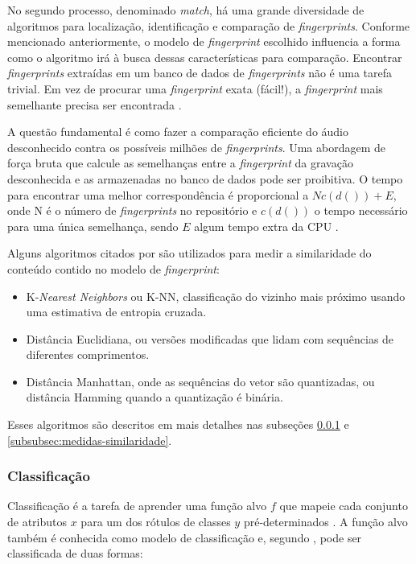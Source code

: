 No segundo processo, denominado \textit{match}, há uma grande diversidade de algoritmos para localização, identificação e comparação de \textit{fingerprints}. Conforme mencionado anteriormente, o modelo de \textit{fingerprint} escolhido influencia a forma como o algoritmo irá à busca dessas características para comparação. Encontrar \textit{fingerprints} extraídas em um banco de dados de \textit{fingerprints} não é uma tarefa trivial. Em vez de procurar uma \textit{fingerprint} exata (fácil!), a \textit{fingerprint} mais semelhante precisa ser encontrada \cite{haitsma2002}.

A questão fundamental é como fazer a comparação eficiente do áudio desconhecido contra os possíveis milhões de \textit{fingerprints}. Uma abordagem de força bruta que calcule as semelhanças entre a \textit{fingerprint} da gravação desconhecida e as armazenadas no banco de dados pode ser proibitiva. O tempo para encontrar uma melhor correspondência é proporcional a \({N c(d()) + E}\), onde N é o número de \textit{fingerprints} no repositório e \({c(d())}\) o tempo necessário para uma única semelhança, sendo \({E}\) algum tempo extra da CPU \cite{cano2005}.

Alguns algoritmos citados por  são utilizados para medir a similaridade do conteúdo contido no modelo de \textit{fingerprint}:

\begin{itemize}
    \item K-\textit{Nearest Neighbors} ou K-NN, classificação do vizinho mais próximo usando uma estimativa de entropia cruzada.
    \item Distância Euclidiana, ou versões modificadas que lidam com sequências de diferentes comprimentos.
    \item Distância Manhattan, onde as sequências do vetor são quantizadas, ou distância Hamming quando a quantização é binária.
\end{itemize}

Esses algoritmos são descritos em mais detalhes nas subseções  \ref{subsubsec:classificacao} e \ref{subsubsec:medidas-similaridade}.

\subsubsection{Classificação} \label{subsubsec:classificacao}
Classificação é a tarefa de aprender uma função alvo \textbf{\({f}\)} que mapeie cada conjunto de atributos \textbf{\({x}\)} para um dos rótulos de classes \textbf{\({y}\)} pré-determinados \cite{pang2009}. A função alvo também é conhecida como modelo de classificação e, segundo , pode ser classificada de duas formas:

